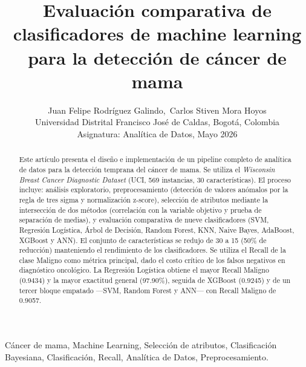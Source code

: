 \documentclass[journal]{IEEEtran}
\begin{document}
\title{Evaluación comparativa de clasificadores de machine learning\\
para la detección de cáncer de mama}

\author{Juan Felipe Rodríguez Galindo,~Carlos Stiven Mora Hoyos\\
{\small Universidad Distrital Francisco José de Caldas, Bogotá, Colombia}\\
{\small Asignatura: Analítica de Datos, Mayo 2026}}


\maketitle

\begin{abstract}
Este artículo presenta el diseño e implementación de un pipeline completo de analítica de datos para la detección temprana del cáncer de mama. Se utiliza el \textit{Wisconsin Breast Cancer Diagnostic Dataset} (UCI, 569 instancias, 30 características). El proceso incluye: análisis exploratorio, preprocesamiento (detección de valores anómalos por la regla de tres sigma y normalización z-score), selección de atributos mediante la intersección de dos métodos (correlación con la variable objetivo y prueba de separación de medias), y evaluación comparativa de nueve clasificadores (SVM, Regresión Logística, Árbol de Decisión, Random Forest, KNN, Naive Bayes, AdaBoost, XGBoost y ANN). El conjunto de características se redujo de 30 a 15 (50\% de reducción) manteniendo el rendimiento de los clasificadores. Se utiliza el Recall de la clase Maligno como métrica principal, dado el costo crítico de los falsos negativos en diagnóstico oncológico. La Regresión Logística obtiene el mayor Recall Maligno (0.9434) y la mayor exactitud general (97.90\%), seguida de XGBoost (0.9245) y de un tercer bloque empatado —SVM, Random Forest y ANN— con Recall Maligno de 0.9057.
\end{abstract}

\begin{IEEEkeywords}
Cáncer de mama, Machine Learning, Selección de atributos, Clasificación Bayesiana, Clasificación, Recall, Analítica de Datos, Preprocesamiento.
\end{IEEEkeywords}
\end{document}
